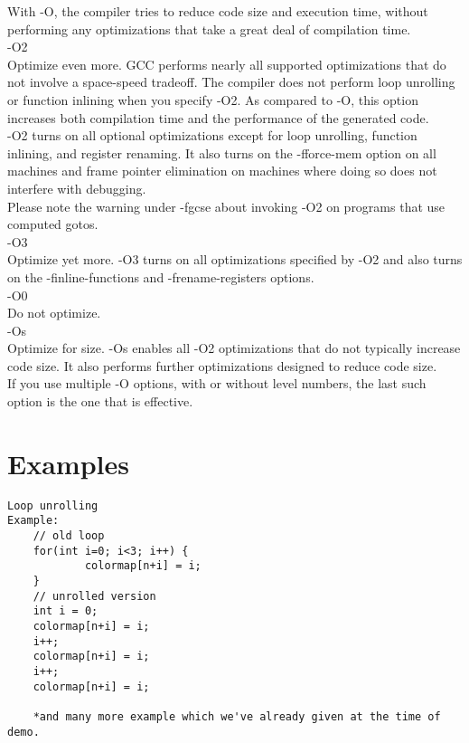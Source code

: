 \documentclass{sem5}
\begin{document}
With -O, the compiler tries to reduce code size and execution time, without performing any optimizations that take a great deal of compilation time. \\

-O2\\
Optimize even more. GCC performs nearly all supported optimizations that do not involve a space-speed tradeoff. The compiler does not perform loop unrolling or function inlining when you specify -O2. As compared to -O, this option increases both compilation time and the performance of the generated code.\\
-O2 turns on all optional optimizations except for loop unrolling, function inlining, and register renaming. It also turns on the -fforce-mem option on all machines and frame pointer elimination on machines where doing so does not interfere with debugging.\\

Please note the warning under -fgcse about invoking -O2 on programs that use computed gotos. \\

-O3\\
Optimize yet more. -O3 turns on all optimizations specified by -O2 and also turns on the -finline-functions and -frename-registers options. \\
-O0\\
Do not optimize. \\
-Os\\
Optimize for size. -Os enables all -O2 optimizations that do not typically increase code size. It also performs further optimizations designed to reduce code size.\\
If you use multiple -O options, with or without level numbers, the last such option is the one that is effective.\\
\section*{Examples}
\begin{lstlisting}
Loop unrolling
Example:
	// old loop 
	for(int i=0; i<3; i++) {
			colormap[n+i] = i;
	}
	// unrolled version
	int i = 0;
	colormap[n+i] = i;
	i++;
	colormap[n+i] = i;
	i++;
	colormap[n+i] = i;
	
	*and many more example which we've already given at the time of demo.
\end{lstlisting}	
	 
\end{document}
